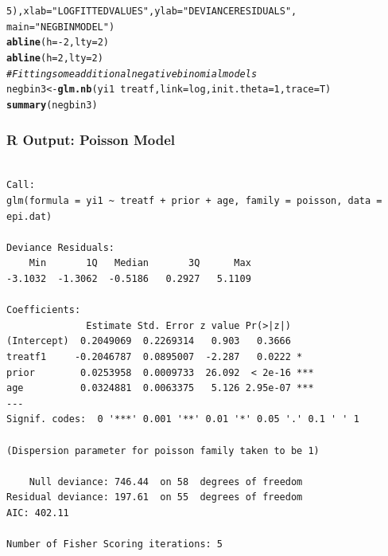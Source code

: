 \documentclass[oneside]{book}\usepackage[]{graphicx}\usepackage[svgnames]{xcolor}
\makeatletter
\newcommand{\hlnum}[1]{\textcolor[rgb]{0.686,0.059,0.569}{#1}}%
\newcommand{\hlstr}[1]{\textcolor[rgb]{0.192,0.494,0.8}{#1}}%
\newcommand{\hlcom}[1]{\textcolor[rgb]{0.678,0.584,0.686}{\textit{#1}}}%
\newcommand{\hlopt}[1]{\textcolor[rgb]{0,0,0}{#1}}%
\newcommand{\hlstd}[1]{\textcolor[rgb]{0.345,0.345,0.345}{#1}}%
\newcommand{\hlkwb}[1]{\textcolor[rgb]{0.69,0.353,0.396}{#1}}%
\newcommand{\hlkwc}[1]{\textcolor[rgb]{0.333,0.667,0.333}{#1}}%
\newcommand{\hlkwd}[1]{\textcolor[rgb]{0.737,0.353,0.396}{\textbf{#1}}}%
\newenvironment{kframe}{%
 \def\at@end@of@kframe{}%
 \ifinner\ifhmode%
  \def\at@end@of@kframe{\end{minipage}}%
  \begin{minipage}{\columnwidth}%
 \fi\fi%
 \def\FrameCommand##1{\hskip\@totalleftmargin \hskip-\fboxsep
 \colorbox{shadecolor}{##1}\hskip-\fboxsep
     \hskip-\linewidth \hskip-\@totalleftmargin \hskip\columnwidth}%
 \MakeFramed {\advance\hsize-\width
   \@totalleftmargin\z@ \linewidth\hsize
   \@setminipage}}%
 {\par\unskip\endMakeFramed%
 \at@end@of@kframe}
\newenvironment{knitrout}{}{} %
\makeatother
\begin{document}
\begin{knitrout}
\begin{kframe}
\begin{alltt}
  \hlnum{5}\hlstd{),} \hlkwc{xlab} \hlstd{=} \hlstr{"LOG FITTED VALUES"}\hlstd{,} \hlkwc{ylab} \hlstd{=} \hlstr{"DEVIANCE RESIDUALS"}\hlstd{,}
  \hlkwc{main} \hlstd{=} \hlstr{"NEG BIN MODEL"}\hlstd{)}
\hlkwd{abline}\hlstd{(}\hlkwc{h} \hlstd{=} \hlopt{-}\hlnum{2}\hlstd{,} \hlkwc{lty} \hlstd{=} \hlnum{2}\hlstd{)}
\hlkwd{abline}\hlstd{(}\hlkwc{h} \hlstd{=} \hlnum{2}\hlstd{,} \hlkwc{lty} \hlstd{=} \hlnum{2}\hlstd{)}
\hlcom{# Fitting some additional negative binomial models}
\hlstd{negbin3} \hlkwb{<-} \hlkwd{glm.nb}\hlstd{(yi1} \hlopt{~} \hlstd{treatf,} \hlkwc{link} \hlstd{= log,} \hlkwc{init.theta} \hlstd{=} \hlnum{1}\hlstd{,} \hlkwc{trace} \hlstd{= T)}
\hlkwd{summary}\hlstd{(negbin3)}
\end{alltt}
\end{kframe}
\end{knitrout}
\subsubsection*{R Output: Poisson Model}
\begin{knitrout}
\color{fgcolor}\begin{kframe}
\begin{verbatim}

Call:
glm(formula = yi1 ~ treatf + prior + age, family = poisson, data = epi.dat)

Deviance Residuals: 
    Min       1Q   Median       3Q      Max  
-3.1032  -1.3062  -0.5186   0.2927   5.1109  

Coefficients:
              Estimate Std. Error z value Pr(>|z|)    
(Intercept)  0.2049069  0.2269314   0.903   0.3666    
treatf1     -0.2046787  0.0895007  -2.287   0.0222 *  
prior        0.0253958  0.0009733  26.092  < 2e-16 ***
age          0.0324881  0.0063375   5.126 2.95e-07 ***
---
Signif. codes:  0 '***' 0.001 '**' 0.01 '*' 0.05 '.' 0.1 ' ' 1

(Dispersion parameter for poisson family taken to be 1)

    Null deviance: 746.44  on 58  degrees of freedom
Residual deviance: 197.61  on 55  degrees of freedom
AIC: 402.11

Number of Fisher Scoring iterations: 5
\end{verbatim}
\end{kframe}
\end{knitrout}
\end{document}
